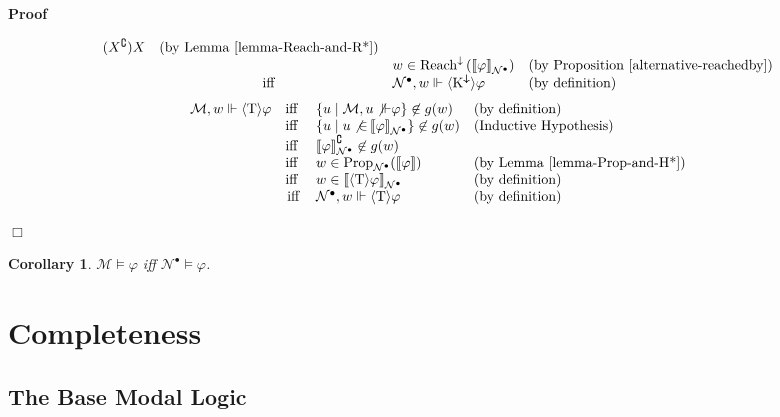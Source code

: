 \documentclass{article}
\newcommand{\nin}{\not\in}
\newcommand{\tmmathbf}[1]{\ensuremath{\boldsymbol{#1}}}
\newcommand{\tmop}[1]{\ensuremath{\operatorname{#1}}}
\newcommand{\tmtextbf}[1]{\text{{\bfseries{#1}}}}
\newenvironment{proof}{\noindent\textbf{Proof\ }}{\hspace*{\fill}$\Box$\medskip}
\newtheorem{corollary}{Corollary}
\newcommand{\Model}{\ensuremath{\mathcal{M}}}
\newcommand{\Net}{\ensuremath{\mathcal{N}}}
\newcommand{\semantics}[1]{\left\llbracket #1 \right\rrbracket}
\newcommand{\diaKnownby}{\langle \tmmathbf{\text{K}^{\downarrow}} \rangle}
\newcommand{\diaTyp}{\langle \tmmathbf{\text{T}} \rangle}
\newcommand{\Reachedby}{\textsf{\tmop{Reach}}^{\downarrow}}
\newcommand{\Prop}{\textsf{\tmop{Prop}}}
\begin{document}
\begin{proof}
\begin{description}
\[\begin{array}{lcll}
{         (X^{\complement})} X & \text{(by Lemma \ref{lemma-Reach-and-R*})}\\
         &  & w \in \Reachedby \left( \semantics{\varphi}_{\Net^{\bullet}}
         \right) & \text{(by Proposition \ref{alternative-reachedby})}\\
         & \tmop{iff} & \Net^{\bullet}, w \Vdash \diaKnownby \varphi &
         \text{(by definition)}
       \end{array} \]
    \tmtextbf{$\diaTyp \varphi$ case:}
    \[ \begin{array}{lcll}
         \Model, w \Vdash \diaTyp \varphi & \text{iff } & \left\{ u \mid
         \Model, u \not{\Vdash} \varphi \right\} \nin g (w) & \text{(by
         definition)}\\
         & \text{iff } & \left\{ u \mid u \not{\in}
         \semantics{\varphi}_{\Net^{\bullet}} \right\} \nin g (w) &
         \text{(Inductive Hypothesis)}\\
         & \text{iff } & \semantics{\varphi}_{\Net^{\bullet}}^{\complement}
         \nin g (w) & \\
         & \text{iff } & w \in \Prop_{\Net^{\bullet}} (\semantics{\varphi}) &
         \text{(by Lemma \ref{lemma-Prop-and-H*})}\\
         & \text{iff } & w \in \semantics{\diaTyp \varphi}_{\Net^{\bullet}} &
         \text{(by definition)}\\
         & \tmop{iff} & \Net^{\bullet}, w \Vdash \diaTyp \varphi & \text{(by
         definition)}
       \end{array} \]
  \end{description}
  
\end{proof}

\begin{corollary}
  {\Model}$\models \varphi$ iff $\Net^{\bullet} \models \varphi$.
\end{corollary}

\section{Completeness}

\subsection{The Base Modal Logic}
\end{document}
